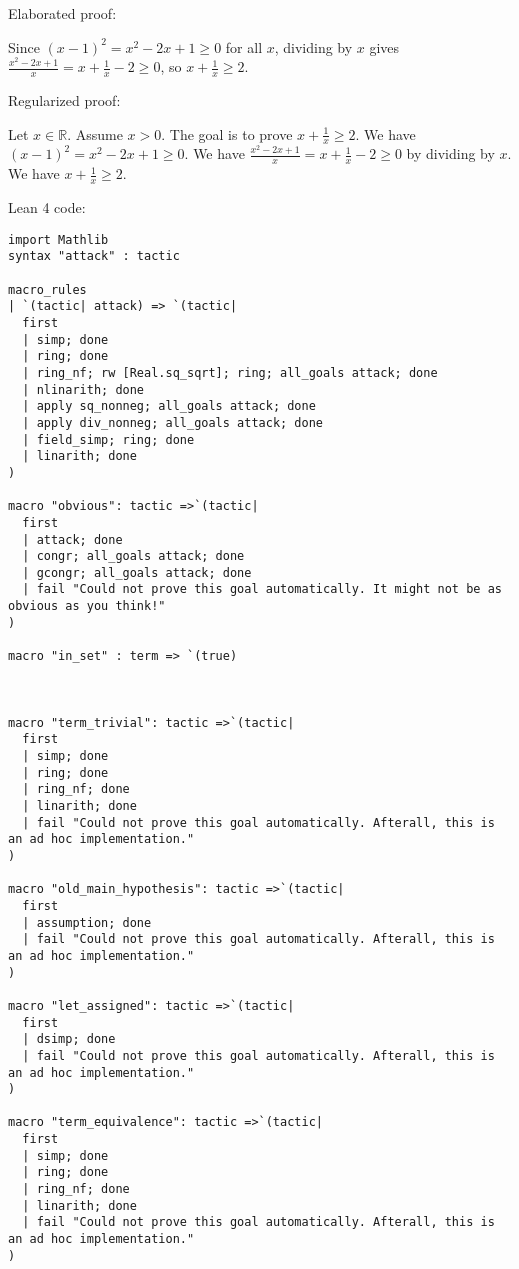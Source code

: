 \documentclass{article}
\begin{document}
Elaborated proof:
\begin{tcolorbox}[colback=green!10, width=\linewidth]
Since $(x-1)^2 = x^2 - 2x + 1 \ge 0$ for all $x$, dividing by $x$ gives $\frac{x^2 - 2x + 1}{x} = x + \frac{1}{x} - 2 \ge 0$, so $x + \frac{1}{x} \ge 2$.
\end{tcolorbox}

Regularized proof:
\begin{tcolorbox}[colback=red!10, width=\linewidth]
Let $x\in\mathbb{R}$. Assume $x>0$.
The goal is to prove $x + \frac{1}{x} \ge 2$.
We have ${\left(x-1\right)}^2 = x^2 - 2x + 1 \ge 0$.
We have $\frac{x^2 - 2x + 1}{x} = x + \frac{1}{x} - 2 \ge 0$ by dividing by $x$.
We have $x + \frac{1}{x} \ge 2$.
\end{tcolorbox}

Lean 4 code:
\begin{tcolorbox}[colback=white!10, width=\linewidth]
\begin{lstlisting}[language=Lean4]
import Mathlib
syntax "attack" : tactic

macro_rules
| `(tactic| attack) => `(tactic|
  first
  | simp; done
  | ring; done
  | ring_nf; rw [Real.sq_sqrt]; ring; all_goals attack; done
  | nlinarith; done
  | apply sq_nonneg; all_goals attack; done
  | apply div_nonneg; all_goals attack; done
  | field_simp; ring; done
  | linarith; done
)

macro "obvious": tactic =>`(tactic|
  first
  | attack; done
  | congr; all_goals attack; done
  | gcongr; all_goals attack; done
  | fail "Could not prove this goal automatically. It might not be as obvious as you think!"
)

macro "in_set" : term => `(true)



macro "term_trivial": tactic =>`(tactic|
  first
  | simp; done
  | ring; done
  | ring_nf; done
  | linarith; done
  | fail "Could not prove this goal automatically. Afterall, this is an ad hoc implementation."
)

macro "old_main_hypothesis": tactic =>`(tactic|
  first
  | assumption; done
  | fail "Could not prove this goal automatically. Afterall, this is an ad hoc implementation."
)

macro "let_assigned": tactic =>`(tactic|
  first
  | dsimp; done
  | fail "Could not prove this goal automatically. Afterall, this is an ad hoc implementation."
)

macro "term_equivalence": tactic =>`(tactic|
  first
  | simp; done
  | ring; done
  | ring_nf; done
  | linarith; done
  | fail "Could not prove this goal automatically. Afterall, this is an ad hoc implementation."
)


\end{lstlisting}
\end{tcolorbox}
\end{document}
